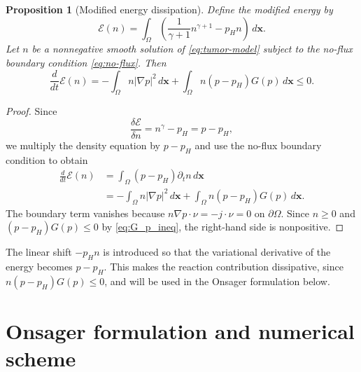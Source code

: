 \documentclass[11pt]{article}
\theoremstyle{plain}
\numberwithin{equation}{section}
\newtheorem{proposition}{Proposition}[section]
\begin{document}
\begin{proposition}[Modified energy dissipation]
\label{prop:energy-dissipation}
Define the modified energy by
\begin{equation}\label{eq:modified-energy}
    \mathcal E(n)
    =
    \int_\Omega
    \left(
    \frac{1}{\gamma+1}n^{\gamma+1}-p_H n
    \right)\,d\mathbf{x} .
\end{equation}
Let \(n\) be a nonnegative smooth solution of \eqref{eq:tumor-model}
subject to the no-flux boundary condition \eqref{eq:no-flux}. Then
\begin{equation}\label{eq:energy-dissipation}
    \frac{d}{dt}\mathcal E(n)
    =
    -\int_\Omega n|\nabla p|^2\,d\mathbf{x}
    +
    \int_\Omega n(p-p_H)G(p)\,d\mathbf{x}
    \le 0 .
\end{equation}
\end{proposition}

\begin{proof}
Since
\[
    \frac{\delta\mathcal E}{\delta n}=n^\gamma-p_H=p-p_H,
\]
we multiply the density equation by \(p-p_H\) and use the no-flux boundary
condition to obtain
\[
\begin{aligned}
    \frac{d}{dt}\mathcal E(n)
    &=
    \int_\Omega (p-p_H)\partial_t n\,d\mathbf{x}  \\
    &=
    -\int_\Omega n|\nabla p|^2\,d\mathbf{x}
    +
    \int_\Omega n(p-p_H)G(p)\,d\mathbf{x} .
\end{aligned}
\]
The boundary term vanishes because \(n\nabla p\cdot\nu=-j\cdot\nu=0\) on
\(\partial\Omega\). Since \(n\ge0\) and \((p-p_H)G(p)\le0\) by \eqref{eq:G_p_ineq}, the right-hand
side is nonpositive.
\end{proof}



The linear shift \(-p_H n\) is introduced so that the variational derivative
of the energy becomes \(p-p_H\). This makes the reaction contribution
dissipative, since \(n(p-p_H)G(p)\le0\), and will be used in the Onsager
formulation below.










\section{Onsager formulation and numerical scheme}
\label{sec:onsager-scheme}
\label{sec:onsager}
\end{document}
